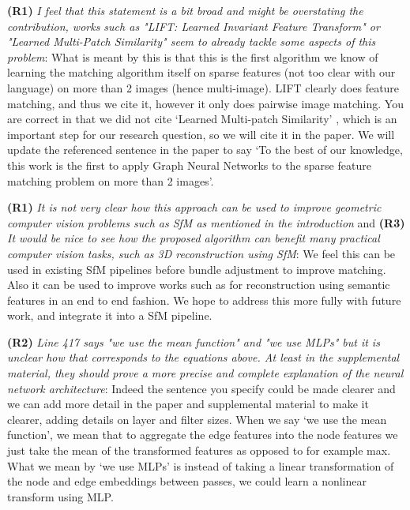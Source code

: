 \documentclass[10pt,twocolumn,letterpaper]{article}
\begin{document}
\textbf{(R1)} \textit{I feel that this statement is a bit broad and might be overstating the contribution, works such as "LIFT: Learned Invariant Feature Transform" or "Learned Multi-Patch Similarity" seem to already tackle some aspects of this problem}:
What is meant by this is that this is the first algorithm we know of learning the matching algorithm itself on sparse features (not too clear with our language) on more than 2 images (hence multi-image).
LIFT \cite{yi2016lift} clearly does feature matching, and thus we cite it, however it only does pairwise image matching.
You are correct in that we did not cite `Learned Multi-patch Similarity' \cite{hartmann2017learned}, which is an important step for our research question, so we will cite it in the paper.
We will update the referenced sentence in the paper to say `To the best of our knowledge, this work is the first to apply Graph Neural Networks to the sparse feature matching problem on more than 2 images'.

\textbf{(R1)} \textit{It is not very clear how this approach can be used to improve geometric computer vision problems such as SfM as mentioned in the introduction} and \textbf{(R3)} \textit{It would be nice to see how the proposed algorithm can benefit many practical computer vision tasks, such as 3D reconstruction using SfM}:
We feel this can be used in existing SfM pipelines before bundle adjustment to improve matching.
Also it can be used to improve works such as \cite{zhu2015single} for reconstruction using semantic features in an end to end fashion.
We hope to address this more fully with future work, and integrate it into a SfM pipeline.



\textbf{(R2)} \textit{Line 417 says "we use the mean function" and "we use MLPs" but it is unclear how that corresponds to the equations above. At least in the supplemental material, they should prove a more precise and complete explanation of the neural network architecture}:
Indeed the sentence you specify could be made clearer and we can add more detail in the paper and supplemental material to make it clearer, adding details on layer and filter sizes.
When we say `we use the mean function', we mean that to aggregate the edge features into the node features we just take the mean of the transformed features as opposed to for example max.
What we mean by `we use MLPs' is instead of taking a linear transformation of the node and edge embeddings between passes, we could learn a nonlinear transform using MLP.
\end{document}
